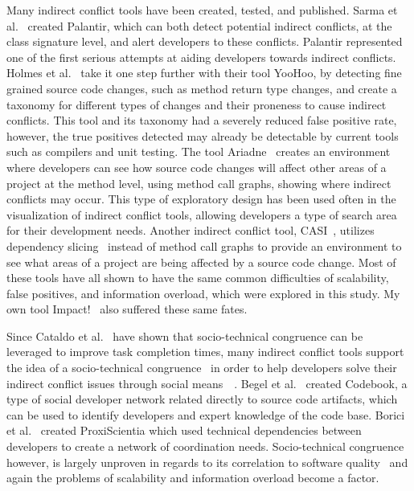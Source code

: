 Many indirect conflict tools have been created, tested, and published. Sarma et al.~\cite{Sarma:2007:TSA} created Palantir,
which can both detect potential indirect conflicts, at the class signature level, and alert developers to these conflicts.
Palantir represented one of the first serious attempts at aiding developers towards indirect conflicts. Holmes et
al.~\cite{Holmes:2010:CAR} take it one step further with their tool YooHoo, by detecting fine grained source code changes,
such as method return type changes, and create a taxonomy for different types of changes and their proneness to cause
indirect conflicts. This tool and its taxonomy had a severely reduced false positive rate, however, the true positives
detected may already be detectable by current tools such as compilers and unit testing. The tool Ariadne~\cite{Trainer:2005:BGT}
creates an environment where developers can see how source code changes will affect other areas of a project at the
method level, using method call graphs, showing where indirect conflicts may occur. This type of exploratory design has
been used often in the visualization of indirect conflict tools, allowing developers a type of search area for their development
needs. Another indirect conflict tool, CASI~\cite{Servant:2010:CPI}, utilizes dependency slicing~\cite{Bajracharya:2009:SIS}
instead of method call graphs to provide an environment to see what areas of a project are being affected by a source code change.
Most of these tools have all shown to have the same common difficulties of scalability, false positives, and information overload,
which were explored in this study. My own tool
Impact!~\cite{Ell:2013} also suffered these same fates.

Since Cataldo et al.~\cite{Cataldo:2006:ICR} have shown that socio-technical congruence can be leveraged to improve task completion
times, many indirect conflict tools support the idea of a socio-technical congruence~\cite{Kwan:2011:ESC} in order to help
developers solve their indirect conflict issues through social means~\cite{Begel:2010:CDE}~\cite{Borici:2012:CHA}.
Begel et al.~\cite{Begel:2010:CDE} created Codebook, a type of social developer network related directly to source code
artifacts, which can be used to identify developers and expert knowledge of the code base. Borici et al.~\cite{Borici:2012:CHA}
created ProxiScientia which used technical dependencies between developers to create a network of coordination needs.
Socio-technical congruence however, is largely unproven in regards to its correlation to
software quality~\cite{Kwan:2011:SCE} and again the problems of scalability and information overload become a factor.

